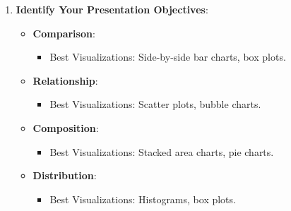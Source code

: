 \documentclass[aspectratio=169]{beamer}
\begin{document}
\begin{frame}[fragile]
\begin{enumerate}
        \item \textbf{Identify Your Presentation Objectives}:
            \begin{itemize}
                \item \textbf{Comparison}:
                    \begin{itemize}
                        \item Best Visualizations: Side-by-side bar charts, box plots.
                    \end{itemize}
                \item \textbf{Relationship}:
                    \begin{itemize}
                        \item Best Visualizations: Scatter plots, bubble charts.
                    \end{itemize}
                \item \textbf{Composition}:
                    \begin{itemize}
                        \item Best Visualizations: Stacked area charts, pie charts.
                    \end{itemize}
                \item \textbf{Distribution}:
                    \begin{itemize}
                        \item Best Visualizations: Histograms, box plots.
                    \end{itemize}
            \end{itemize}
    \end{enumerate}
\end{frame}
\end{document}
